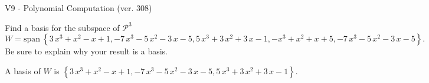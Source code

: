 \begin{exercise}
  \begin{exerciseTitle}V9 - Polynomial Computation (ver. 308)\end{exerciseTitle}
  \begin{exerciseStatement}
    Find a basis for the subspace of \(\mathcal{P}^3\) 
\[W=\mathrm{span}\ \left\{3 \, x^{3} + x^{2} - x + 1 , -7 \, x^{3} - 5 \, x^{2} - 3 \, x - 5 , 5 \, x^{3} + 3 \, x^{2} + 3 \, x - 1 , -x^{3} + x^{2} + x + 5 , -7 \, x^{3} - 5 \, x^{2} - 3 \, x - 5\right\}.\]
 Be sure to explain why your result is a basis.


  \end{exerciseStatement}
  \begin{exerciseAnswer}
   A basis of \(W\) is  \(\left\{3 \, x^{3} + x^{2} - x + 1 , -7 \, x^{3} - 5 \, x^{2} - 3 \, x - 5 , 5 \, x^{3} + 3 \, x^{2} + 3 \, x - 1\right\}\).
  


  \end{exerciseAnswer}
\end{exercise}
